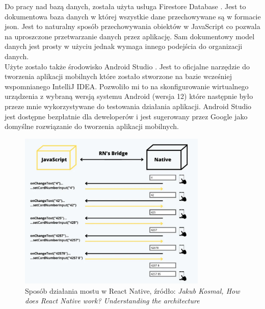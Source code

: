     Do pracy nad bazą danych, została użyta usługa Firestore Database \cite{Firestore}. Jest to dokumentowa baza danych w której wszystkie dane przechowywane są w formacie json. Jest to naturalny sposób przechowywania obiektów w JavaScript co pozwala na uproszczone przetwarzanie danych przez aplikację. Sam dokumentowy model danych jest prosty w użyciu jednak wymaga innego podejścia do organizacji danych. \\
    
    Użyte zostało także środowisko Android Studio \cite{AndroidStudio}. Jest to oficjalne narzędzie do tworzenia aplikacji mobilnych które zostało stworzone na bazie wcześniej wspomnianego IntelliJ IDEA. Pozwoliło mi to na skonfigurowanie wirtualnego urządzenia z wybraną wersją systemu Android (wersja 12) które następnie było przeze mnie wykorzystywane do testowania działania aplikacji. Android Studio jest dostępne bezpłatnie dla deweloperów i jest sugerowany przez Google jako domyślne rozwiązanie do tworzenia aplikacji mobilnych.

    \begin{figure}[H]
        \centering
        \includegraphics[width=0.8\textwidth]{img/3/react_native_concept.png}
        \caption{Sposób działania mostu w React Native, źródło: \textit{Jakub Kosmal, How does React Native work? Understanding the architecture}}
        \label{fig:react-native}
    \end{figure}
